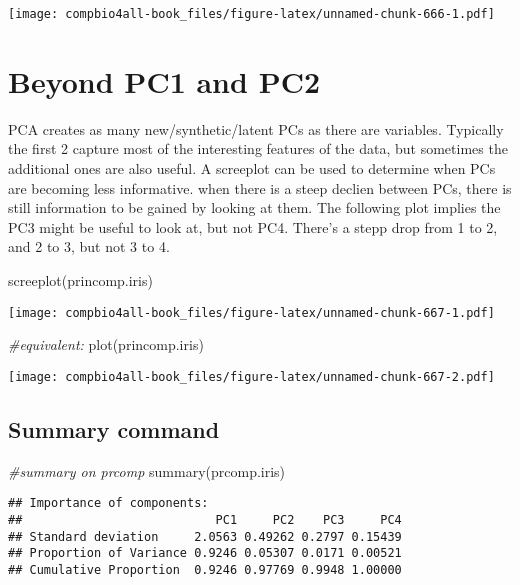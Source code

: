 \documentclass[
]{book}
\newenvironment{Shaded}{\begin{snugshade}}{\end{snugshade}}
\newcommand{\CommentTok}[1]{\textcolor[rgb]{0.56,0.35,0.01}{\textit{#1}}}
\newcommand{\FunctionTok}[1]{\textcolor[rgb]{0.00,0.00,0.00}{#1}}
\newcommand{\NormalTok}[1]{#1}
\begin{document}
\texttt{[image: compbio4all-book\_files/figure-latex/unnamed-chunk-666-1.pdf]}

\hypertarget{beyond-pc1-and-pc2}{%
\chapter{Beyond PC1 and PC2}\label{beyond-pc1-and-pc2}}

PCA creates as many new/synthetic/latent PCs as there are variables. Typically the first 2 capture most of the interesting features of the data, but sometimes the additional ones are also useful. A screeplot can be used to determine when PCs are becoming less informative. when there is a steep declien between PCs, there is still information to be gained by looking at them. The following plot implies the PC3 might be useful to look at, but not PC4. There's a stepp drop from 1 to 2, and 2 to 3, but not 3 to 4.

\begin{Shaded}
\begin{Highlighting}[]
\FunctionTok{screeplot}\NormalTok{(princomp.iris)}
\end{Highlighting}
\end{Shaded}

\texttt{[image: compbio4all-book\_files/figure-latex/unnamed-chunk-667-1.pdf]}

\begin{Shaded}
\begin{Highlighting}[]
\CommentTok{\#equivalent: }
\FunctionTok{plot}\NormalTok{(princomp.iris)}
\end{Highlighting}
\end{Shaded}

\texttt{[image: compbio4all-book\_files/figure-latex/unnamed-chunk-667-2.pdf]}

\hypertarget{summary-command}{%
\section{Summary command}\label{summary-command}}

\begin{Shaded}
\begin{Highlighting}[]
\CommentTok{\#summary on prcomp}
\FunctionTok{summary}\NormalTok{(prcomp.iris)}
\end{Highlighting}
\end{Shaded}

\begin{verbatim}
## Importance of components:
##                           PC1     PC2    PC3     PC4
## Standard deviation     2.0563 0.49262 0.2797 0.15439
## Proportion of Variance 0.9246 0.05307 0.0171 0.00521
## Cumulative Proportion  0.9246 0.97769 0.9948 1.00000
\end{verbatim}
\end{document}
